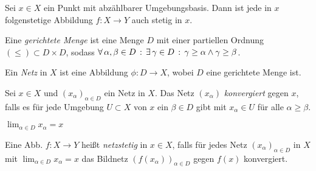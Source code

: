 \documentclass{cheat-sheet}
\begin{document}
\begin{prop}
  Sei $x \in X$ ein Punkt mit abzählbarer Umgebungsbasis. Dann ist jede in $x$ folgenstetige Abbildung $f : X \to Y$ auch stetig in $x$.
\end{prop}

\begin{defn}
  Eine \emph{gerichtete Menge} ist eine Menge $D$ mit einer partiellen Ordnung $(\le) \subset D \times D$, sodass
  $\forall \, {\alpha, \beta \in D} \,:\, \exists \, {\gamma \in D} \,:\, \gamma \geq \alpha \wedge \gamma \geq \beta$.
\end{defn}

\begin{defn}
  Ein \emph{Netz} in $X$ ist eine Abbildung $\phi : D \to X$, wobei $D$ eine gerichtete Menge ist.
\end{defn}

\iffalse
\begin{bspe}
  \begin{itemize}
    \item $D = (\N, \leq)$
    \item $X$ beliebige Menge, $D = (\mathcal{P}(X), \subseteq)$ oder $D = (\mathcal{P}(X), \supseteq)$
    \item Sei $(X, \tau)$ ein top. Raum, $x \in X$, $D \coloneqq (\Set{U \subset X}{\text{$U$ Umgebung von $x$}}, \leq)$ mit $U \leq V \coloneqq V \subset U$.
  \end{itemize}
\end{bspe}
\fi

\begin{defn}
  Sei $x \in X$ und $(x_\alpha)_{\alpha \in D}$ ein Netz in $X$. Das Netz $(x_\alpha)$ \emph{konvergiert} gegen $x$, falls es für jede Umgebung $U \subset X$ von $x$ ein $\beta \in D$ gibt mit $x_\alpha \in U$ für alle $\alpha \geq \beta$.
\end{defn}

\begin{nota}
  $\lim_{\alpha \in D} x_\alpha = x$
\end{nota}

\begin{defn}
  Eine Abb. $f : X \to Y$ heißt \emph{netzstetig} in $x \in X$, falls für jedes Netz $(x_\alpha)_{\alpha \in D}$ in $X$ mit $\lim_{\alpha \in D} x_\alpha = x$ das Bildnetz $(f(x_\alpha))_{\alpha \in D}$ gegen $f(x)$ konvergiert.
\end{defn}
\end{document}
